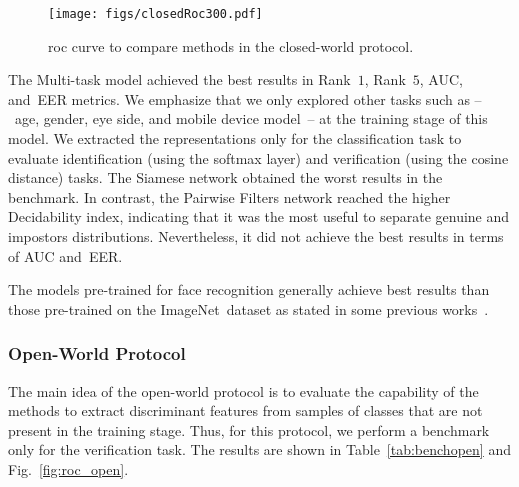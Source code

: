 \begin{figure}[!ht]
\centering

   	\texttt{[image: figs/closedRoc300.pdf]}

\vspace{-3mm}
\caption{\acrfull*{roc} curve to compare methods in the closed-world protocol.}
\label{fig:roc_closed}
\end{figure}

The Multi-task model achieved the best results in Rank~$1$, Rank~$5$, AUC, and~EER metrics.
We emphasize that we only explored other tasks such as --~age, gender, eye side, and mobile device model~-- at the training stage of this model.
We extracted the representations only for the classification task to evaluate identification (using the softmax layer) and verification (using the cosine distance) tasks.
The Siamese network obtained the worst results in the benchmark.
In contrast, the Pairwise Filters network reached the higher Decidability index, indicating that it was the most useful to separate genuine and impostors distributions.
Nevertheless, it did not achieve the best results in terms of AUC and~EER.

The models pre-trained for face recognition generally achieve best results than those pre-trained on the ImageNet~dataset as stated in some previous works~\cite{Luz2018, boyd2019fine}.


\subsubsection{Open-World Protocol}
\label{sec:open}

The main idea of the open-world protocol is to evaluate the capability of the methods to extract discriminant features from samples of classes that are not present in the training stage.
Thus, for this protocol, we perform a benchmark only for the verification task.
The results are shown in Table~\ref{tab:benchopen} and Fig.~\ref{fig:roc_open}.


